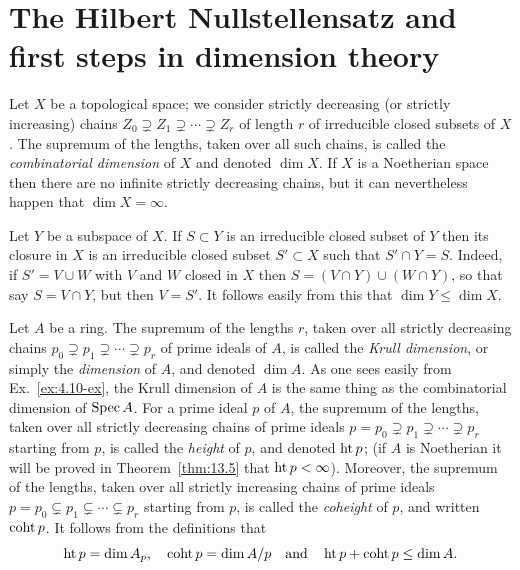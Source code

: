 \section{The Hilbert Nullstellensatz and first steps in dimension theory}\label{sec:5}

Let $X$ be a topological space; we consider strictly decreasing (or
strictly increasing) chains $Z_0 \supsetneq Z_1 \supsetneq \cdots \supsetneq Z_r$ of length $r$ of irreducible closed
subsets of $X$. The supremum of the lengths, taken over all such chains, is
called the \emph{combinatorial dimension} of $X$ and denoted $\dim X$. If $X$ is a
Noetherian space then there are no infinite strictly decreasing chains, but it
can nevertheless happen that $\dim X = \infty$.

Let $Y$ be a subspace of $X$. If $S \subset Y$ is an irreducible closed subset of $Y$ then
its closure in $X$ is an irreducible closed subset $S' \subset X$ such that $S' \cap Y = S$.
Indeed, if $S' = V \cup W$ with $V$ and $W$ closed in $X$ then $S = (V \cap Y) \cup (W \cap Y)$,
so that say $S = V \cap Y$, but then $V = S'$. It follows easily from this that
$\dim Y \le \dim X$.

Let $A$ be a ring. The supremum of the lengths $r$, taken over all strictly
decreasing chains $p_0 \supsetneq p_1 \supsetneq \cdots \supsetneq p_r$ of prime ideals of $A$, is called the \emph{Krull
dimension}, or simply the \emph{dimension} of $A$, and denoted $\dim A$. As one sees
easily from Ex.~\ref{ex:4.10-ex}, the Krull dimension of $A$ is the same thing as the
combinatorial dimension of $\operatorname{Spec} A$. For a prime ideal $p$ of $A$, the supremum
of the lengths, taken over all strictly decreasing chains of prime ideals
$p = p_0 \supsetneq p_1 \supsetneq \cdots \supsetneq p_r$ starting from $p$, is called the \emph{height} of $p$, and denoted
$\operatorname{ht} p$; (if $A$ is Noetherian it will be proved in Theorem~\ref{thm:13.5} that $\operatorname{ht} p < \infty$).
Moreover, the supremum of the lengths, taken over all strictly increasing
chains of prime ideals $p = p_0 \subsetneq p_1 \subsetneq \cdots \subsetneq p_r$ starting from $p$, is called the
\emph{coheight} of $p$, and written $\operatorname{coht} p$. It follows from the definitions that
\[
  \operatorname{ht} p = \dim A_p, \quad \operatorname{coht} p = \dim A/p \quad \text{and} \quad \operatorname{ht} p + \operatorname{coht} p \le \dim A.
\]

